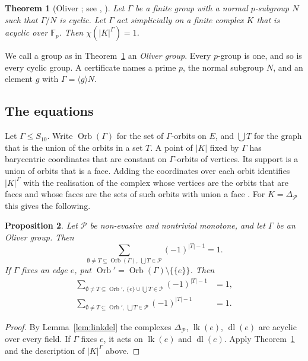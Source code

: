\documentclass[11pt]{article}
\theoremstyle{plain}
\newtheorem{theorem}{Theorem}[section]
\newtheorem{proposition}[theorem]{Proposition}
\theoremstyle{definition}
\theoremstyle{remark}
\newcommand{\PP}{\mathcal P}
\newcommand{\Del}{\Delta_{\mathcal P}}
\newcommand{\lk}{\operatorname{lk}}
\newcommand{\dl}{\operatorname{dl}}
\newcommand{\Orb}{\operatorname{Orb}}
\newcommand{\F}{\mathbb F}
\begin{document}
\begin{theorem}[Oliver \cite{Oli}; see {\cite[Thm.~4.1]{AB}}, {\cite[Thm.~4]{Eng}}]\label{thm:oliver}
Let $\Gamma$ be a finite group with a normal $p$-subgroup $N$ such that $\Gamma/N$ is cyclic.
Let $\Gamma$ act simplicially on a finite complex $K$ that is acyclic over $\F_p$.
Then $\chi(|K|^\Gamma)=1$.
\end{theorem}

We call a group as in Theorem~\ref{thm:oliver} an \emph{Oliver group}.
Every $p$-group is one, and so is every cyclic group.
A certificate names a prime $p$, the normal subgroup $N$, and an element $g$ with $\Gamma=\langle g\rangle N$.

\subsection{The equations}

Let $\Gamma\le S_{10}$.
Write $\Orb(\Gamma)$ for the set of $\Gamma$-orbits on $E$, and $\bigcup T$ for the graph that is the union of the orbits in a set $T$.
A point of $|K|$ fixed by $\Gamma$ has barycentric coordinates that are constant on $\Gamma$-orbits of vertices.
Its support is a union of orbits that is a face.
Adding the coordinates over each orbit identifies $|K|^\Gamma$ with the realisation of the complex whose vertices are the orbits that are faces and whose faces are the sets of such orbits with union a face \cite[\S2]{AB}.
For $K=\Del$ this gives the following.

\begin{proposition}\label{prop:eq}
Let $\PP$ be non-evasive and nontrivial monotone, and let $\Gamma$ be an Oliver group.
Then
\begin{equation}\tag{fix}
\sum_{\emptyset\ne T\subseteq\Orb(\Gamma),\ \bigcup T\in\PP}(-1)^{|T|-1}=1 .
\end{equation}
If $\Gamma$ fixes an edge $e$, put $\Orb'=\Orb(\Gamma)\setminus\{\{e\}\}$.
Then
\begin{align}\tag{lk}
\sum_{\emptyset\ne T\subseteq\Orb',\ \{e\}\cup\bigcup T\in\PP}(-1)^{|T|-1}&=1,\\
\tag{dl}
\sum_{\emptyset\ne T\subseteq\Orb',\ \bigcup T\in\PP}(-1)^{|T|-1}&=1 .
\end{align}
\end{proposition}

\begin{proof}
By Lemma~\ref{lem:linkdel} the complexes $\Del$, $\lk(e)$, $\dl(e)$ are acyclic over every field.
If $\Gamma$ fixes $e$, it acts on $\lk(e)$ and $\dl(e)$.
Apply Theorem~\ref{thm:oliver} and the description of $|K|^\Gamma$ above.
\end{proof}
\end{document}
